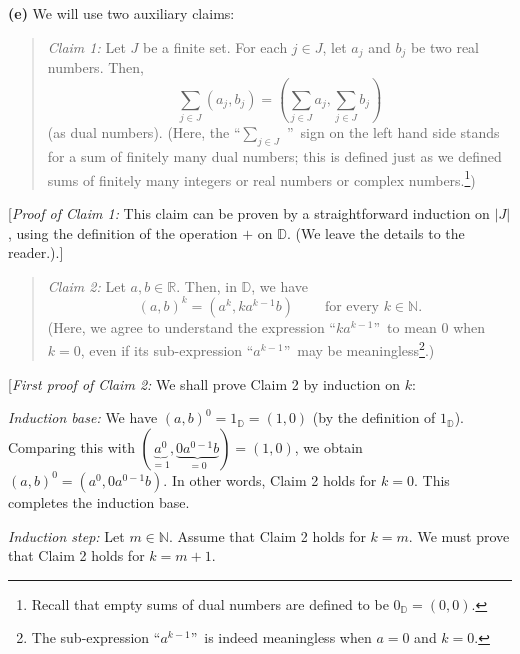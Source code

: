 \documentclass[paper=a4, fontsize=12pt]{scrartcl}%
\let\sumnonlimits\sum
\renewcommand{\sum}{\sumnonlimits\limits}
\theoremstyle{plainsl}
\theoremstyle{definition}
\theoremstyle{remark}
\newenvironment{statement}{\begin{quote}}{\end{quote}}
\begin{document}
\textbf{(e)} We will use two auxiliary claims:

\begin{statement}
\textit{Claim 1:} Let $J$ be a finite set. For each $j\in J$, let $a_{j}$ and
$b_{j}$ be two real numbers. Then,%
\[
\sum_{j\in J}\left(  a_{j},b_{j}\right)  =\left(  \sum_{j\in J}a_{j}%
,\sum_{j\in J}b_{j}\right)
\]
(as dual numbers). (Here, the \textquotedblleft$\sum_{j\in J}$%
\textquotedblright\ sign on the left hand side stands for a sum of finitely
many dual numbers; this is defined just as we defined sums of finitely many
integers or real numbers or complex numbers.\footnote{Recall that empty sums
of dual numbers are defined to be $0_{\mathbb{D}}=\left(  0,0\right)  $.})
\end{statement}

[\textit{Proof of Claim 1:} This claim can be proven by a straightforward
induction on $\left\vert J\right\vert $, using the definition of the operation
$+$ on $\mathbb{D}$. (We leave the details to the reader.).]

\begin{statement}
\textit{Claim 2:} Let $a,b\in\mathbb{R}$. Then, in $\mathbb{D}$, we have%
\[
\left(  a,b\right)  ^{k}=\left(  a^{k},ka^{k-1}b\right)
\ \ \ \ \ \ \ \ \ \ \text{for every }k\in\mathbb{N}.
\]
(Here, we agree to understand the expression \textquotedblleft$ka^{k-1}%
$\textquotedblright\ to mean $0$ when $k=0$, even if its sub-expression
\textquotedblleft$a^{k-1}$\textquotedblright\ may be meaningless\footnote{The
sub-expression \textquotedblleft$a^{k-1}$\textquotedblright\ is indeed
meaningless when $a=0$ and $k=0$.}.)
\end{statement}

[\textit{First proof of Claim 2:} We shall prove Claim 2 by induction on $k$:

\textit{Induction base:} We have $\left(  a,b\right)  ^{0}=1_{\mathbb{D}%
}=\left(  1,0\right)  $ (by the definition of $1_{\mathbb{D}}$). Comparing
this with $\left(  \underbrace{a^{0}}_{=1},\underbrace{0a^{0-1}b}_{=0}\right)
=\left(  1,0\right)  $, we obtain $\left(  a,b\right)  ^{0}=\left(
a^{0},0a^{0-1}b\right)  $. In other words, Claim 2 holds for $k=0$. This
completes the induction base.

\textit{Induction step:} Let $m\in\mathbb{N}$. Assume that Claim 2 holds for
$k=m$. We must prove that Claim 2 holds for $k=m+1$.
\end{document}

